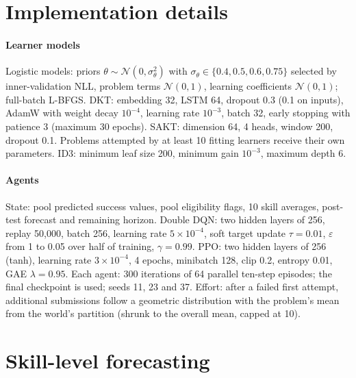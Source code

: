 \documentclass[a4paper,preprint,12pt,authoryear]{elsarticle}
\begin{document}
\section{Implementation details}\label{app:impl}

\paragraph{Learner models} Logistic models: priors $\theta\sim\mathcal N(0,\sigma_\theta^2)$ with $\sigma_\theta\in\{0.4,0.5,0.6,0.75\}$ selected by inner-validation NLL, problem terms $\mathcal N(0,1)$, learning coefficients $\mathcal N(0,1)$; full-batch L-BFGS. DKT: embedding 32, LSTM 64, dropout 0.3 (0.1 on inputs), AdamW with weight decay $10^{-4}$, learning rate $10^{-3}$, batch 32, early stopping with patience 3 (maximum 30 epochs). SAKT: dimension 64, 4 heads, window 200, dropout 0.1. Problems attempted by at least 10 fitting learners receive their own parameters. ID3: minimum leaf size 200, minimum gain $10^{-3}$, maximum depth 6.

\paragraph{Agents} State: {{pool}} predicted success values, {{pool}} eligibility flags, 10 skill averages, post-test forecast and remaining horizon. Double DQN: two hidden layers of 256, replay 50,000, batch 256, learning rate $5\times10^{-4}$, soft target update $\tau=0.01$, $\varepsilon$ from 1 to 0.05 over half of training, $\gamma=0.99$. PPO: two hidden layers of 256 (tanh), learning rate $3\times10^{-4}$, 4 epochs, minibatch 128, clip 0.2, entropy 0.01, GAE $\lambda=0.95$. Each agent: 300 iterations of 64 parallel ten-step episodes; the final checkpoint is used; seeds 11, 23 and 37. Effort: after a failed first attempt, additional submissions follow a geometric distribution with the problem's mean from the world's partition (shrunk to the overall mean, capped at 10).

\section{Skill-level forecasting}\label{app:skills}

\begin{table}[H]
\centering
\caption{AUC by primary skill of the target problem (test learners, models fitted on A).}
\label{tab:skills}
\small
{}
\end{table}
\end{document}
